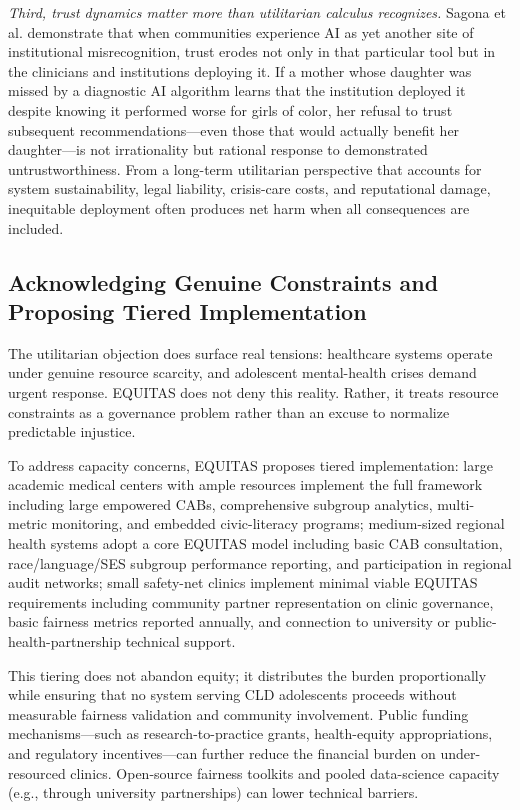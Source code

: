 \documentclass[12pt,letterpaper]{article}
\begin{document}
\textit{Third, trust dynamics matter more than utilitarian calculus recognizes.} Sagona et al. demonstrate that when communities experience AI as yet another site of institutional misrecognition, trust erodes not only in that particular tool but in the clinicians and institutions deploying it.\cite{sagona2025} If a mother whose daughter was missed by a diagnostic AI algorithm learns that the institution deployed it despite knowing it performed worse for girls of color, her refusal to trust subsequent recommendations---even those that would actually benefit her daughter---is not irrationality but rational response to demonstrated untrustworthiness.\cite{sagona2025} From a long-term utilitarian perspective that accounts for system sustainability, legal liability, crisis-care costs, and reputational damage, inequitable deployment often produces net harm when all consequences are included.\cite{sagona2025}

\subsection{Acknowledging Genuine Constraints and Proposing Tiered Implementation}

The utilitarian objection does surface real tensions: healthcare systems operate under genuine resource scarcity, and adolescent mental-health crises demand urgent response.\cite{munn_idai700} EQUITAS does not deny this reality. Rather, it treats resource constraints as a governance problem rather than an excuse to normalize predictable injustice.

To address capacity concerns, EQUITAS proposes tiered implementation: large academic medical centers with ample resources implement the full framework including large empowered CABs, comprehensive subgroup analytics, multi-metric monitoring, and embedded civic-literacy programs; medium-sized regional health systems adopt a core EQUITAS model including basic CAB consultation, race/language/SES subgroup performance reporting, and participation in regional audit networks; small safety-net clinics implement minimal viable EQUITAS requirements including community partner representation on clinic governance, basic fairness metrics reported annually, and connection to university or public-health-partnership technical support.\cite{lekadir2025}

This tiering does not abandon equity; it distributes the burden proportionally while ensuring that no system serving CLD adolescents proceeds without measurable fairness validation and community involvement.\cite{lekadir2025} Public funding mechanisms---such as research-to-practice grants, health-equity appropriations, and regulatory incentives---can further reduce the financial burden on under-resourced clinics. Open-source fairness toolkits and pooled data-science capacity (e.g., through university partnerships) can lower technical barriers.\cite{chen2023}
\end{document}

